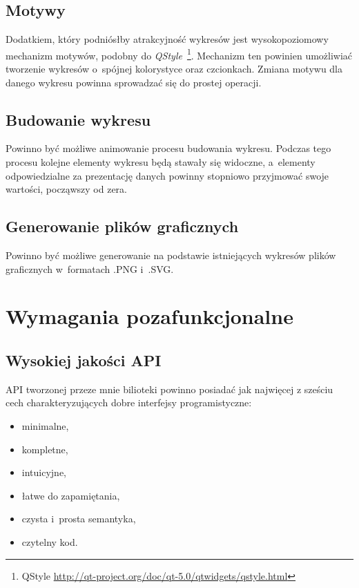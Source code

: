 \subsection{Motywy}
Dodatkiem, który podniósłby atrakcyjność wykresów jest wysokopoziomowy mechanizm motywów, podobny do \textit{QStyle}~\footnote{QStyle \url{http://qt-project.org/doc/qt-5.0/qtwidgets/qstyle.html}}. Mechanizm ten powinien umożliwiać tworzenie wykresów o~spójnej kolorystyce oraz czcionkach. Zmiana motywu dla danego wykresu powinna sprowadzać się do prostej operacji.

\subsection{Budowanie wykresu}
Powinno być możliwe animowanie procesu budowania wykresu. Podczas tego procesu kolejne elementy wykresu będą stawały się widoczne, a~elementy odpowiedzialne za prezentację danych powinny stopniowo przyjmować swoje wartości, począwszy od zera.

\subsection{Generowanie plików graficznych}
Powinno być możliwe generowanie na podstawie istniejących wykresów plików graficznych  w~formatach .PNG i~.SVG.


\section{Wymagania pozafunkcjonalne}
\subsection{Wysokiej jakości API}
API tworzonej przeze mnie bilioteki powinno posiadać jak najwięcej z sześciu cech charakteryzujących dobre interfejsy programistyczne:
\begin{itemize}
\item{minimalne,}
\item{kompletne,}
\item{intuicyjne,} 
\item{łatwe do zapamiętania,}
\item{czysta i~prosta semantyka,}
\item{czytelny kod.}
\end{itemize}

